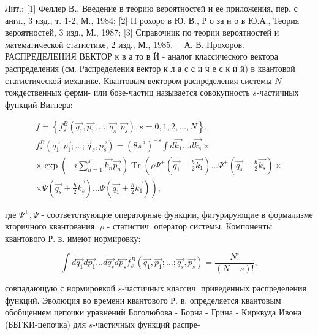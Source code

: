 \documentclass[10pt]{article}
\begin{document}
Лит.: [1] Феллер В., Введение в теорию вероятностей и ее приложения, пер. с англ., 3 изд., т. 1-2, М., 1984; [2] П рохоро в Ю. В., Р о за н о в Ю.А., Теория вероятностей, 3 изд., М., 1987; [3] Справочник по теории вероятностей и математической статистике, 2 изд., М., $1985 . \quad$ А. В. Прохоров. РАСПРЕДЕЛЕНИЯ ВЕКТОР к в а то в Й - аналог классического вектора распределения (см. Распределения вектор к л а с с и ч е с к и й) в квантовой статистической механике. Квантовым вектором распределения системы $N$ тождественных ферми- или бозе-частиц называется совокупность $s$-частичных функций Вигнера:



\[

\begin{gathered}

f=\left\{f_{s}^{B}\left(\overrightarrow{q_{1}}, \overrightarrow{p_{1}} ; \ldots ; \overrightarrow{q_{s}}, \overrightarrow{p_{s}}\right), s=0,1,2, \ldots, N\right\}, \\

f_{s}^{B}\left(\overrightarrow{q_{1}}, \overrightarrow{p_{1}} ; \ldots ; \vec{q}_{s}, \overrightarrow{p_{s}}\right)=\left(8 \pi^{3}\right)^{-s} \int d \overrightarrow{k_{1}} \ldots d \overrightarrow{k_{s}} \times \\

\times \exp \left(-i \sum_{n=1}^{s} \overrightarrow{k_{n}} \overrightarrow{p_{n}}\right) \operatorname{Tr}\left(\rho \Psi^{+}\left(\overrightarrow{q_{1}}-\frac{\hbar}{2} \overrightarrow{k_{1}}\right) \ldots \Psi^{+}\left(\overrightarrow{q_{s}}-\frac{\hbar}{2} \overrightarrow{k_{s}}\right) \times\right. \\

\left.\times \Psi\left(\overrightarrow{q_{s}}+\frac{\hbar}{2} \overrightarrow{k_{s}}\right) \ldots \Psi\left(\overrightarrow{q_{1}}+\frac{\hbar}{2} \overrightarrow{k_{1}}\right)\right),

\end{gathered}

\]



где $\Psi^{+}, \Psi$ - соответствующие операторные функции, фигурирующие в формализме вторичного квантования, $\rho$ - статистич. оператор системы. Компоненты квантового Р. в. имеют нормировку:



\[

\int d \overrightarrow{q_{1}} d \overrightarrow{p_{1}} \ldots d \overrightarrow{q_{s}} d \overrightarrow{p_{s}} f_{s}^{B}\left(\overrightarrow{q_{1}}, \overrightarrow{p_{1}} ; \ldots ; \overrightarrow{q_{s}}, \overrightarrow{p_{s}}\right)=\frac{N !}{(N-s) !},

\]



совпадающую с нормировкой $s$-частичных классич. приведенных распределения функций. Эволюция во времени квантового Р. в. определяется квантовым обобщением цепочки уравнений Боголюбова - Борна - Грина - Кирквуда Ивона (ББГКИ-цепочка) для $s$-частичных функций распре-
\end{document}
